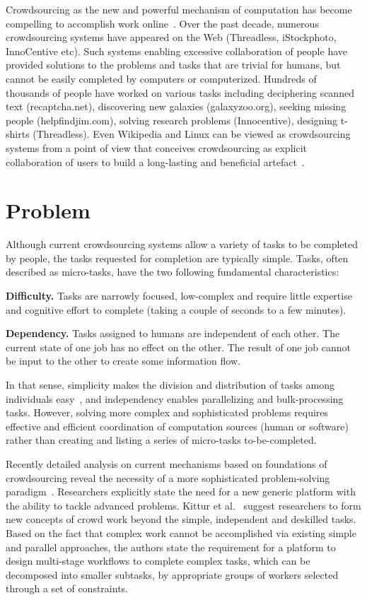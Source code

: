 Crowdsourcing as the new and powerful mechanism of computation has become 
compelling to accomplish work online~\cite{Kittur2011}. Over the past decade, numerous 
crowdsourcing systems have appeared on the Web (Threadless, iStockphoto, 
InnoCentive etc). Such systems enabling excessive collaboration of people have 
provided solutions to the problems and tasks that are trivial for humans, but 
cannot be easily completed by computers or computerized. Hundreds of thousands 
of people have worked on various tasks including deciphering scanned text (recaptcha.net), 
discovering new galaxies (galaxyzoo.org), seeking missing people (helpfindjim.com), 
solving research problems (Innocentive), designing t-shirts (Threadless). Even 
Wikipedia and Linux can be viewed as crowdsourcing systems from a point of view that
conceives crowdsourcing as explicit collaboration of users to 
build a long-lasting and beneficial artefact~\cite{Doan2011}.


\section{Problem}
\label{sec:problem}

Although current crowdsourcing systems allow a variety of tasks 
to be completed by people, the tasks requested for completion are typically simple. 
Tasks, often described as micro-tasks, have the two following fundamental characteristics:

\textbf{Difficulty.} Tasks are narrowly focused, low-complex and require 
little expertise and cognitive effort to complete (taking a couple of seconds to 
a few minutes).

\textbf{Dependency.} Tasks assigned to humans are independent of each other. 
The current state of one job has no effect on the other. The result of one job cannot 
be input to the other to create some information flow.

In that sense, simplicity makes the division and distribution of tasks among 
individuals easy~\cite{Zhang2011}, and independency enables parallelizing 
and bulk-processing tasks. However, solving more complex and sophisticated 
problems requires effective and efficient coordination of computation sources 
(human or software) rather than creating and listing a series of micro-tasks 
to-be-completed.

Recently detailed analysis on current mechanisms based on foundations of 
crowdsourcing reveal the necessity of a more sophisticated problem-solving 
paradigm~\cite{Kittur2013}. Researchers explicitly state the need for a new generic platform 
with the ability to tackle advanced problems. Kittur et al.~\cite{Kittur2013} 
suggest researchers to form new concepts of crowd work beyond 
the simple, independent and deskilled tasks. Based on the fact that complex 
work cannot be accomplished via existing simple and parallel approaches,
the authors state the requirement for a platform to design multi-stage workflows 
to complete complex tasks, which can be decomposed into smaller subtasks, 
by appropriate groups of workers selected through a set of constraints.

